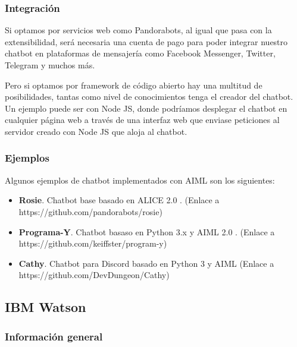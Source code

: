 \subsubsection*{Integración}

Si optamos por servicios web como Pandorabots, al igual que pasa con la extensibilidad, será necesaria una cuenta de pago para poder integrar nuestro chatbot en plataformas de mensajería como Facebook Messenger, Twitter, Telegram y muchos más.

Pero si optamos por framework de código abierto hay una multitud de posibilidades, tantas como nivel de conocimientos tenga el creador del chatbot. Un ejemplo puede ser con Node JS, donde podríamos desplegar el chatbot en cualquier página web a través de una interfaz web que enviase peticiones al servidor creado con Node JS que aloja al chatbot.

\subsubsection*{Ejemplos}

Algunos ejemplos de chatbot implementados con AIML son los siguientes:

\begin{itemize}
    \item \textbf{Rosie}. Chatbot base basado en ALICE 2.0 . (Enlace a https://github.com/pandorabots/rosie)
    \item \textbf{Programa-Y}. Chatbot basaso en Python 3.x y AIML 2.0 . (Enlace a https://github.com/keiffster/program-y)
    \item \textbf{Cathy}. Chatbot para Discord basado en Python 3 y AIML (Enlace a https://github.com/DevDungeon/Cathy)
\end{itemize}


\subsection{IBM Watson}

\subsubsection*{Información general}

